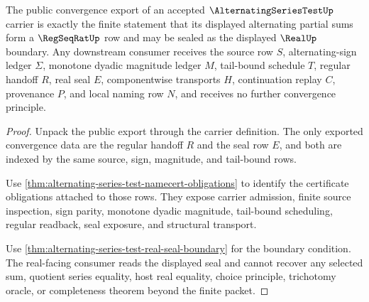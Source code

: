 \begin{theorem}
\label{thm:alternating-series-test-public-convergence-export}
The public convergence export of an accepted $\AlternatingSeriesTestUp$ carrier is exactly the finite statement that its displayed alternating partial sums form a $\RegSeqRatUp$ row and may be sealed as the displayed $\RealUp$ boundary. Any downstream consumer receives the source row $S$, alternating-sign ledger $\Sigma$, monotone dyadic magnitude ledger $M$, tail-bound schedule $T$, regular handoff $R$, real seal $E$, componentwise transports $H$, continuation replay $C$, provenance $P$, and local naming row $N$, and receives no further convergence principle.
\end{theorem}
\begin{proof}
Unpack the public export through the carrier definition. The only exported convergence data are the regular handoff $R$ and the seal row $E$, and both are indexed by the same source, sign, magnitude, and tail-bound rows.

Use \autoref{thm:alternating-series-test-namecert-obligations} to identify the certificate obligations attached to those rows. They expose carrier admission, finite source inspection, sign parity, monotone dyadic magnitude, tail-bound scheduling, regular readback, seal exposure, and structural transport.

Use \autoref{thm:alternating-series-test-real-seal-boundary} for the boundary condition. The real-facing consumer reads the displayed seal and cannot recover any selected sum, quotient series equality, host real equality, choice principle, trichotomy oracle, or completeness theorem beyond the finite packet.
\end{proof}



